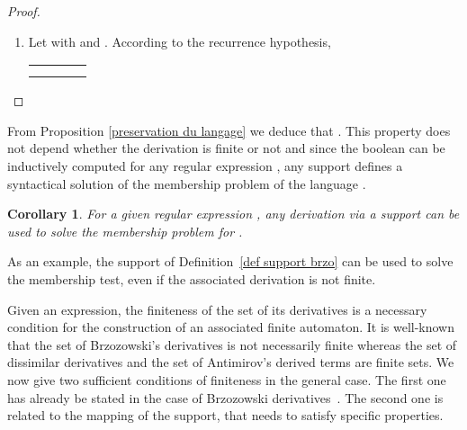 \documentclass{article}
\newtheorem{corollary}{Corollary}
\begin{document}
\begin{proof}
\begin{enumerate}
     \item Let  with  and . According to the recurrence hypothesis, 


     \begin{center}
       \begin{tabular}{llll}
         &&&\\
          &&&\\
       \end{tabular}
     \end{center}

   \end{enumerate}
   
\end{proof}
 
From Proposition \ref{preservation du langage} we deduce that . This property does not depend whether the derivation is finite or not
and since the boolean  can be inductively computed for any regular expression , any support defines a syntactical solution of the membership problem of the language .

  \begin{corollary}
    For a given regular expression , any derivation via a support can be used to solve the membership problem for .
  \end{corollary}
  
As an example, the support  of Definition~\ref{def support brzo} can be used to solve the membership test, even if the associated derivation is not finite. 
  
Given an expression, the finiteness of the set of its derivatives
is a necessary condition for the construction of an associated finite automaton.
It is well-known that the set of Brzozowski's derivatives is not necessarily finite whereas the set of
dissimilar derivatives
and the set of 
Antimirov's derived
terms are finite sets.
We now give two sufficient conditions of finiteness in the general case. The first one has already be stated in the case of Brzozowski derivatives~\cite{Brz64}. The second one is related to the mapping  of the support, that needs to satisfy specific properties. 
\end{document}
